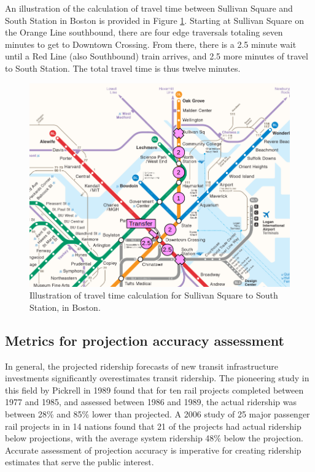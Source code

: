 \documentclass{article}
\begin{document}
An illustration of the calculation of travel time between Sullivan Square and South Station in Boston is provided in Figure \ref{fig:f2}. Starting at Sullivan Square on the Orange Line southbound, there are four edge traversals totaling seven minutes to get to Downtown Crossing. From there, there is a 2.5 minute wait until a Red Line (also Southbound) train arrives, and 2.5 more minutes of travel to South Station. The total travel time is thus twelve minutes. 

\begin{figure}[H]
\begin{center}\includegraphics[scale=0.8]{transfer_demonstration}\end{center}\caption{Illustration of travel time calculation for Sullivan Square to South Station, in Boston.}\label{fig:f2}
\end{figure}

\subsection{Metrics for projection accuracy assessment}

In general, the projected ridership forecasts of new transit infrastructure investments significantly overestimates transit ridership. The pioneering study in this field by Pickrell in 1989 \cite{Pickrell1989} found that for ten rail projects completed between 1977 and 1985, and assessed between 1986 and 1989, the actual ridership was between 28\% and 85\% lower than projected. A 2006 study \cite{Flyvbjerg2006} of 25 major passenger rail projects in  in 14 nations found that 21 of the projects had actual ridership below projections, with the average system ridership 48\% below the projection. Accurate assessment of projection accuracy is imperative for creating ridership estimates that serve the public interest.
\end{document}
